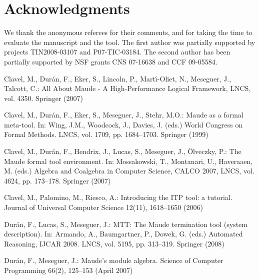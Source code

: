 \documentclass{llncs}
\begin{document}
\section*{Acknowledgments}

We thank the anonymous referees for their comments, and for 
taking the time to evaluate the manuscript 
and the tool.
The first author was partially supported by projects TIN2008-03107 and P07-TIC-03184.
The second author has been partially supported by NSF grants
CNS 07-16638 and CCF 09-05584.


%
\begin{thebibliography}{10}
\providecommand{\url}[1]{\texttt{#1}}
\providecommand{\urlprefix}{URL }

Clavel, M., Dur\'{a}n, F., Eker, S., Lincoln, P., Mart\'{\i}-Oliet, N.,
  Meseguer, J., Talcott, C.: All About {Maude} - A High-Performance Logical
  Framework, %
  LNCS,
  vol. 4350. Springer (2007)

Clavel, M., Dur{\'a}n, F., Eker, S., Meseguer, J., Stehr, M.O.: {M}aude as a
  formal meta-tool. In: Wing, J.M., Woodcock, J., Davies, J. (eds.) World
  Congress on Formal Methods. LNCS, %
  vol. 1709, pp.
  1684--1703. Springer (1999)

Clavel, M., Dur\'an, F., Hendrix, J., Lucas, S., Meseguer, J., \"Olveczky, P.:
  The {Maude} formal tool environment. In: Mossakowski, T., Montanari, U.,
  Haveraaen, M. (eds.) Algebra and Coalgebra in Computer Science, %
  CALCO 2007, %
  LNCS, %
  vol. 4624, pp. 173--178. Springer (2007)

Clavel, M., Palomino, M., Riesco, A.: Introducing the {ITP} tool: a tutorial.
  Journal of Universal Computer Science  12(11),  1618--1650 (2006)

Dur\'{a}n, F., Lucas, S., Meseguer, J.: {MTT}: The {Maude} termination tool
  (system description). In: Armando, A., Baumgartner, P., Dowek, G. (eds.)
  Automated Reasoning, %
  IJCAR 2008.
  LNCS, %
  vol. 5195, pp. 313--319.
  Springer (2008)

Dur{\'a}n, F., Meseguer, J.: {M}aude's module algebra. Science of Computer
  Programming  66(2),  125--153 (April 2007)


\end{thebibliography}
\end{document}

